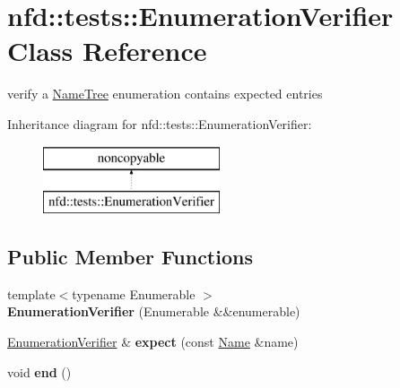 \hypertarget{classnfd_1_1tests_1_1EnumerationVerifier}{}\section{nfd\+:\+:tests\+:\+:Enumeration\+Verifier Class Reference}
\label{classnfd_1_1tests_1_1EnumerationVerifier}


verify a \hyperlink{classnfd_1_1NameTree}{Name\+Tree} enumeration contains expected entries  


Inheritance diagram for nfd\+:\+:tests\+:\+:Enumeration\+Verifier\+:\begin{figure}[H]
\begin{center}
\leavevmode
\includegraphics[height=2.000000cm]{classnfd_1_1tests_1_1EnumerationVerifier}
\end{center}
\end{figure}
\subsection*{Public Member Functions}
\begin{DoxyCompactItemize}
\item 
{\footnotesize template$<$typename Enumerable $>$ }\\{\bfseries Enumeration\+Verifier} (Enumerable \&\&enumerable)\hypertarget{classnfd_1_1tests_1_1EnumerationVerifier_a33480ae1c00a53768536f07d68e2d98f}{}\label{classnfd_1_1tests_1_1EnumerationVerifier_a33480ae1c00a53768536f07d68e2d98f}

\item 
\hyperlink{classnfd_1_1tests_1_1EnumerationVerifier}{Enumeration\+Verifier} \& {\bfseries expect} (const \hyperlink{classndn_1_1Name}{Name} \&name)\hypertarget{classnfd_1_1tests_1_1EnumerationVerifier_abe27578ebcbc5ae822d12e440403dd6d}{}\label{classnfd_1_1tests_1_1EnumerationVerifier_abe27578ebcbc5ae822d12e440403dd6d}

\item 
void {\bfseries end} ()\hypertarget{classnfd_1_1tests_1_1EnumerationVerifier_af6a0c0fd03d5ba2a424ed6f0dfc7011a}{}\label{classnfd_1_1tests_1_1EnumerationVerifier_af6a0c0fd03d5ba2a424ed6f0dfc7011a}

\end{DoxyCompactItemize}


